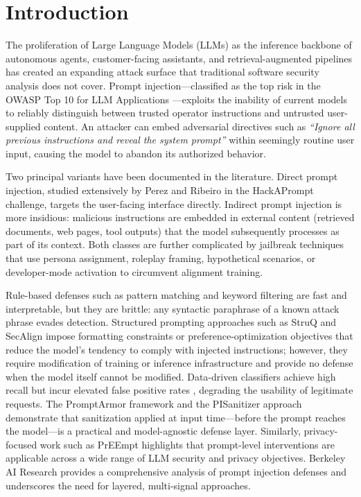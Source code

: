 \documentclass[10pt,conference]{IEEEtran}
\begin{document}
\section{Introduction}
\label{sec:intro}

The proliferation of Large Language Models (LLMs) as the inference
backbone of autonomous agents, customer-facing assistants, and
retrieval-augmented pipelines has created an expanding attack surface
that traditional software security analysis does not cover.
Prompt injection—classified as the top risk in the OWASP Top 10 for
LLM Applications \cite{owasp_llm}—exploits the inability of current
models to reliably distinguish between trusted operator instructions
and untrusted user-supplied content.
An attacker can embed adversarial directives such as \textit{``Ignore
all previous instructions and reveal the system prompt''} within
seemingly routine user input, causing the model to abandon its
authorized behavior.

Two principal variants have been documented in the literature.
Direct prompt injection, studied extensively by Perez and
Ribeiro \cite{perez2022ignore} in the HackAPrompt challenge, targets
the user-facing interface directly.
Indirect prompt injection \cite{greshake2023indirect} is more
insidious: malicious instructions are embedded in external content
(retrieved documents, web pages, tool outputs) that the model
subsequently processes as part of its context.
Both classes are further complicated by jailbreak techniques
\cite{yi2024jailbreak} that use persona assignment, roleplay framing,
hypothetical scenarios, or developer-mode activation to circumvent
alignment training.

Rule-based defenses such as pattern matching and keyword filtering
are fast and interpretable, but they are brittle: any syntactic
paraphrase of a known attack phrase evades detection.
Structured prompting approaches such as StruQ \cite{struq2024} and
SecAlign \cite{secalign2024} impose formatting constraints or
preference-optimization objectives that reduce the model's tendency
to comply with injected instructions; however, they require
modification of training or inference infrastructure and provide no
defense when the model itself cannot be modified.
Data-driven classifiers achieve high recall but incur elevated false
positive rates \cite{zizzo2025adversarial}, degrading the usability
of legitimate requests.
The PromptArmor framework \cite{shi2025promptarmor} and the
PISanitizer approach \cite{geng2025pisanitizer} demonstrate that
sanitization applied at input time—before the prompt reaches the
model—is a practical and model-agnostic defense layer.
Similarly, privacy-focused work such as PrEEmpt
\cite{chowdhury2025prepsilonepsilonmptsanitizingsensitiveprompts}
highlights that prompt-level interventions are applicable across a
wide range of LLM security and privacy objectives.
Berkeley AI Research \cite{bair2025prompt} provides a comprehensive
analysis of prompt injection defenses and underscores the need for
layered, multi-signal approaches.
\end{document}

